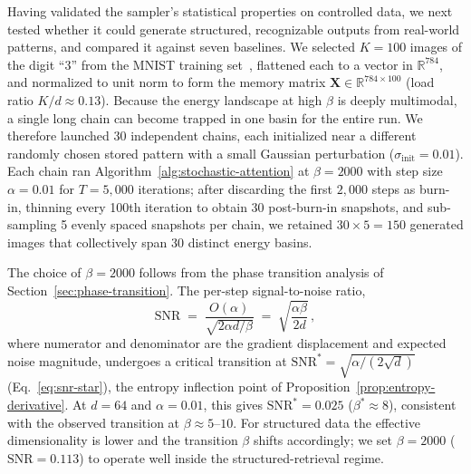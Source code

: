 Having validated the sampler's statistical properties on controlled data, we next tested whether it could generate structured, recognizable outputs from real-world patterns, and compared it against seven baselines.
We selected $K=100$ images of the digit ``3'' from the MNIST training set~\cite{lecunGradientBasedLearningApplied1998}, flattened each to a vector in $\mathbb{R}^{784}$, and normalized to unit norm to form the memory matrix $\mathbf{X}\in\mathbb{R}^{784\times 100}$ (load ratio $K/d\approx 0.13$).
Because the energy landscape at high $\beta$ is deeply multimodal, a single long chain can become trapped in one basin for the entire run.
We therefore launched 30 independent chains, each initialized near a different randomly chosen stored pattern with a small Gaussian perturbation ($\sigma_{\mathrm{init}}=0.01$).
Each chain ran Algorithm~\ref{alg:stochastic-attention} at $\beta=2000$ with step size $\alpha=0.01$ for $T=5{,}000$ iterations; after discarding the first $2{,}000$ steps as burn-in, thinning every 100th iteration to obtain 30 post-burn-in snapshots, and sub-sampling 5 evenly spaced snapshots per chain, we retained $30\times 5=150$ generated images that collectively span 30 distinct energy basins.

The choice of $\beta=2000$ follows from the phase transition analysis of Section~\ref{sec:phase-transition}. The per-step signal-to-noise ratio,
\begin{equation}
\mathrm{SNR}
\;=\;\frac{O(\alpha)}{\sqrt{2\alpha d/\beta}}
\;=\;\sqrt{\frac{\alpha\beta}{2d}}\,,
\label{eq:snr}
\end{equation}
where numerator and denominator are the gradient displacement and expected noise magnitude, undergoes a critical transition at $\mathrm{SNR}^{*}=\sqrt{\alpha/(2\sqrt{d})}$ (Eq.~\ref{eq:snr-star}), the entropy inflection point of Proposition~\ref{prop:entropy-derivative}. At $d{=}64$ and $\alpha{=}0.01$, this gives $\mathrm{SNR}^{*}=0.025$ ($\beta^{*}\approx 8$), consistent with the observed transition at $\beta\approx 5$--$10$. For structured data the effective dimensionality is lower and the transition $\beta$ shifts accordingly; we set $\beta=2000$ ($\mathrm{SNR}=0.113$) to operate well inside the structured-retrieval regime.

